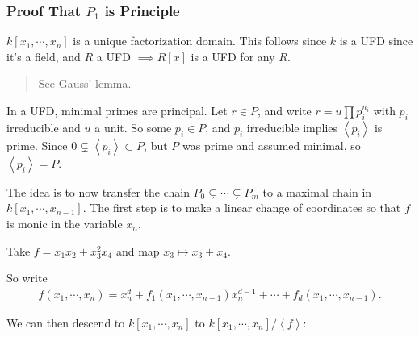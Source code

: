 \hypertarget{proof-that-p_1-is-principle}{%
\subsubsection{\texorpdfstring{Proof That \(P_1\) is
Principle}{Proof That P\_1 is Principle}}\label{proof-that-p_1-is-principle}}

\begin{claim}

\(k[x_1, \cdots, x_{n}]\) is a unique factorization domain. This follows
since \(k\) is a UFD since it's a field, and \(R\) a UFD
\(\implies R[x]\) is a UFD for any \(R\).

\begin{quote}
See Gauss' lemma.
\end{quote}

\end{claim}

\begin{claim}

In a UFD, minimal primes are principal. Let \(r \in P\), and write
\(r = u \prod p_i^{n_i}\) with \(p_i\) irreducible and \(u\) a unit. So
some \(p_i\in P\), and \(p_i\) irreducible implies
\(\left\langle{p_i}\right\rangle\) is prime. Since
\(0 \subsetneq \left\langle{p_i}\right\rangle \subset P\), but \(P\) was
prime and assumed minimal, so \(\left\langle{p_i}\right\rangle = P\).

\end{claim}

The idea is to now transfer the chain
\(P_0 \subsetneq \cdots \subsetneq P_m\) to a maximal chain in
\(k[x_1, \cdots, x_{n-1}]\). The first step is to make a linear change
of coordinates so that \(f\) is monic in the variable \(x_n\).

\begin{example}

Take \(f=x_1x_2 + x_3^2 x_4\) and map \(x_3 \mapsto x_3 + x_4\).

\end{example}

So write
\begin{align*}  
f(x_1, \cdots, x_n) = x_n^d + f_1(x_1, \cdots, x_{n-1}) x_n^{d-1} + \cdots + f_d(x_1, \cdots, x_{n-1})
.\end{align*}

We can then descend to \(k[x_1, \cdots, x_{n}]\) to
\(k[x_1, \cdots, x_{n}]/\left\langle{f}\right\rangle\):

\begin{center}
\end{center}

